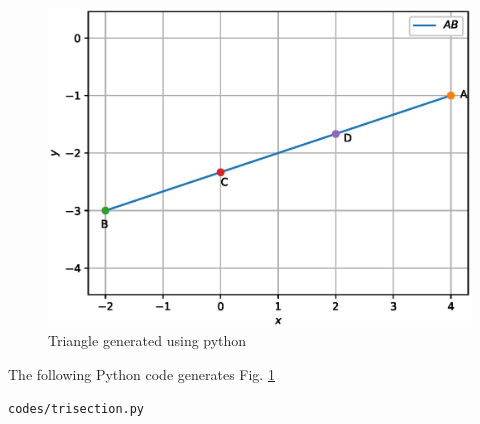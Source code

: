 \begin{enumerate}[label=\thesection.\arabic*.,ref=\thesection.\theenumi]
\begin{figure}[!ht]
\centering
\includegraphics[width=\columnwidth]{./figs/trisection.eps}
\caption{Triangle generated using python}
\label{fig:trisection}
\end{figure} 

\solution The  following Python code generates Fig. \ref{fig:trisection}

\begin{lstlisting}
codes/trisection.py
\end{lstlisting}

\end{enumerate}

